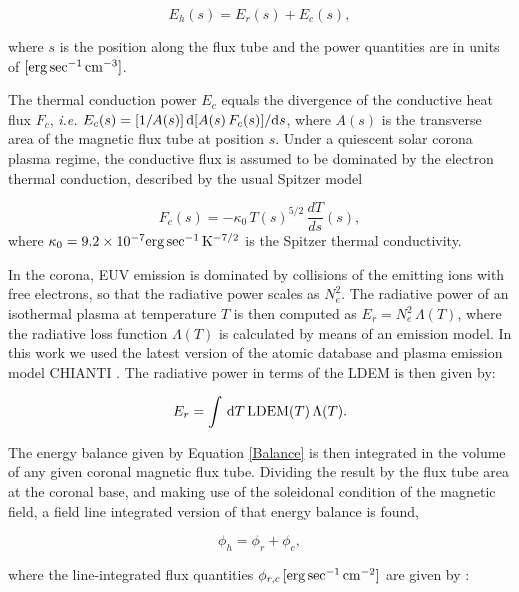 \documentclass[namedreferences]{solarphysics}
\newcommand{\LDEM}{{\rm LDEM}}
\begin{document}
\begin{article}
\begin{equation}\label{Balance}
E_h(s) = E_r(s) + E_c(s),
\end{equation}

\noindent
where $s$ is the position along {the flux tube} and the {power quantities} are in units of $[{\rm erg\,sec^{-1}\,cm^{-3}}]$.

{The thermal conduction power $E_c$ equals the divergence of the conductive heat flux $F_c$, \textit{i.e.} $E_c(s)=[1/A(s)]\,{\rm d}[A(s)\,F_c(s)]/{\rm d}s$, where $A(s)$ is the transverse area of the magnetic flux tube at position $s$. Under a quiescent solar corona plasma regime, the conductive flux is assumed to be dominated by the electron thermal conduction, described by the usual Spitzer model \citep{spitzer_1962}

\begin{equation}\label{Fc}
F_c(s)=-\kappa_0\,{T(s)}^{5/2}\,\frac{dT}{ds}(s),
\end{equation}
where $\kappa_0 = 9.2 \times 10^{-7}  {\rm erg\,sec^{-1}\,K^{-7/2}}$ is the Spitzer thermal conductivity.}

{In the corona, EUV emission is dominated by collisions of the emitting ions with free electrons, so that the radiative power scales as $N_e^2$. The radiative power of an isothermal plasma at temperature $T$ is then computed as $E_r=N_e^2\,\Lambda(T)$, where the radiative loss function $\Lambda(T)$ is calculated by means of an emission model. In this work we used the latest version of the atomic database and plasma emission model CHIANTI \citep{delzanna_2015}. The radiative power in terms of the LDEM is then given by:}

\begin{equation}\label{Er}
E_r = \int\,\textrm{d}T\,\LDEM(T)\,\Lambda(T).
\end{equation}

{The energy balance given by Equation \ref{Balance} is then integrated in the volume of any given coronal magnetic flux tube. Dividing the result by the flux tube area at the coronal base, and making use of the soleidonal condition of the magnetic field, a {field line integrated} version of that energy balance is found,

\begin{equation}\label{FluxBalance}
\phi_h = \phi_r + \phi_c,
\end{equation}

\noindent
where the {line-integrated} flux quantities $\phi_{r,c}\,[\rm{erg\,sec^{-1}\,cm^{-2}}]$ are given by \citep{maccormack_2017}:}


\end{article}
\end{document}
